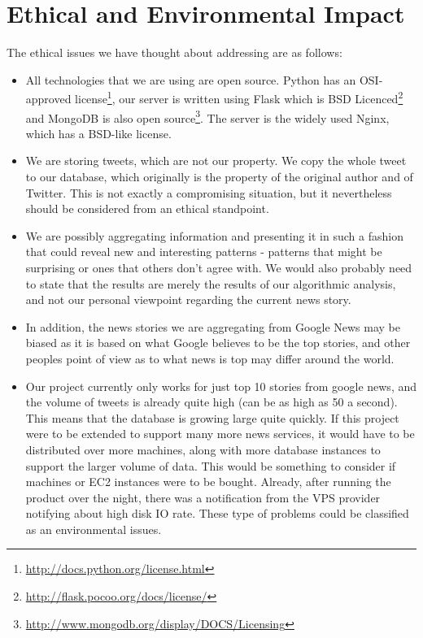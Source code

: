\documentclass[a4paper,12pt]{article}
\begin{document}
	\section{Ethical and Environmental Impact}	
	
	The ethical issues we have thought about addressing are as follows:
	
	\begin{itemize}
	  
	  \item All technologies that we are using are open source. Python has an OSI-approved license\footnote{\url {http://docs.python.org/license.html}}, our server is written using Flask which is BSD Licenced\footnote{\url{http://flask.pocoo.org/docs/license/}} and MongoDB is also open source\footnote{\url{http://www.mongodb.org/display/DOCS/Licensing}}. The server is the widely used Nginx, which has a BSD-like license.
	  
		\item We are storing tweets, which are not our property. We copy the whole tweet to our database, which originally is the property of the original author and of Twitter. This is not exactly a compromising situation, but it nevertheless should be considered from an ethical standpoint.
		
		\item We are possibly aggregating information and presenting it in such a fashion that could reveal new and interesting patterns - patterns that might be surprising or ones that others don't agree with. We would also probably need to state that the results are merely the results of our algorithmic analysis, and not our personal viewpoint regarding the current news story.
		
		\item In addition, the news stories we are aggregating from Google News may be biased as it is based on what Google believes to be the top stories, and other peoples point of view as to what news is top may differ around the world.
		
		\item Our project currently only works for just top 10 stories from google news, and the volume of tweets is already quite high (can be as high as 50 a second). This means that the database is growing large quite quickly. If this project were to be extended to support many more news services, it would have to be distributed over more machines, along with more database instances to support the larger volume of data. This would be something to consider if machines or EC2 instances were to be bought. Already, after running the product over the night, there was a notification from the VPS provider notifying about high disk IO rate. These type of problems could be classified as an environmental issues. 
	  
	  
  \end{itemize}
  
\end{document}
